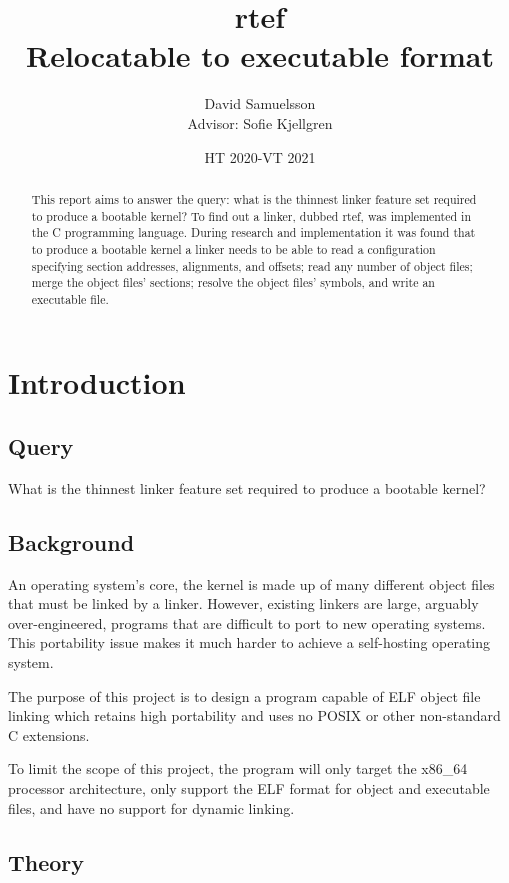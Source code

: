 \documentclass{article}
\title{%
	rtef \\
	{\large Relocatable to executable format}}
\author{David Samuelsson \\
	{\small Advisor: Sofie Kjellgren}}
\affil{NTI Johanneberg}
\date{HT 2020-VT 2021}
\begin{document}
\maketitle

\begin{abstract}
This report aims to answer the query: what is the thinnest linker feature set required to produce a bootable kernel? To find out a linker, dubbed rtef, was implemented in the C programming language. During research and implementation it was found that to produce a bootable kernel a linker needs to be able to read a configuration specifying section addresses, alignments, and offsets; read any number of object files; merge the object files' sections; resolve the object files' symbols, and write an executable file.
\end{abstract}

\tableofcontents
\newpage

\section{Introduction}

\subsection{Query}

What is the thinnest linker feature set required to produce a bootable kernel?

\subsection{Background}

An operating system's core, the kernel is made up of many different object files that must be linked by a linker. However, existing linkers are large, arguably over-engineered, programs that are difficult to port to new operating systems. This portability issue makes it much harder to achieve a self-hosting operating system.

The purpose of this project is to design a program capable of ELF object file linking which retains high portability and uses no POSIX or other non-standard C extensions.

To limit the scope of this project, the program will only target the x86\_64 processor architecture, only support the ELF format for object and executable files, and have no support for dynamic linking.

\subsection{Theory}
\end{document}
